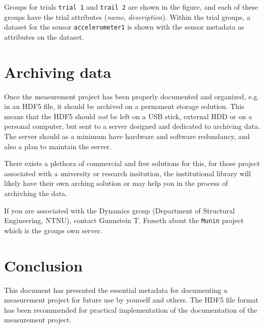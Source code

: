 \documentclass{article}
\begin{document}
Groups for trials \texttt{trial 1} and \texttt{trail 2} are shown in the figure, and each of these groups have the trial attributes (\textit{name}, \textit{description}). Within the trial groups, a dataset for the sensor \texttt{accelerometer1} is shown with the sensor metadata as attributes on the dataset.


\section{Archiving data}

Once the measurement project has been properly documented and organized, e.g. in an HDF5 file, it should be archived on a permanent storage solution. This means that the HDF5 should \emph{not} be left on a USB stick, external HDD or on a personal computer, but sent to a server designed and dedicated to archiving data. The server should as a minimum have hardware and software redundancy, and also a plan to maintain the server.

There exists a plethora of commercial and free solutions for this, for those project associated with a university or research insitution, the institutional library will likely have their own arching solution or may help you in the process of archivhing the data.

If you are associated with the Dynamics group (Department of Structural Engineering, NTNU), contact Gunnstein T. Frøseth about the \texttt{Munin} project which is the groups own server.

\section{Conclusion}

This document has presented the essential metadata for documenting a
measurement project for future use by yourself and others. The HDF5
file format has been recommended for practical implementation of the
documentation of the measurement project.
\end{document}
